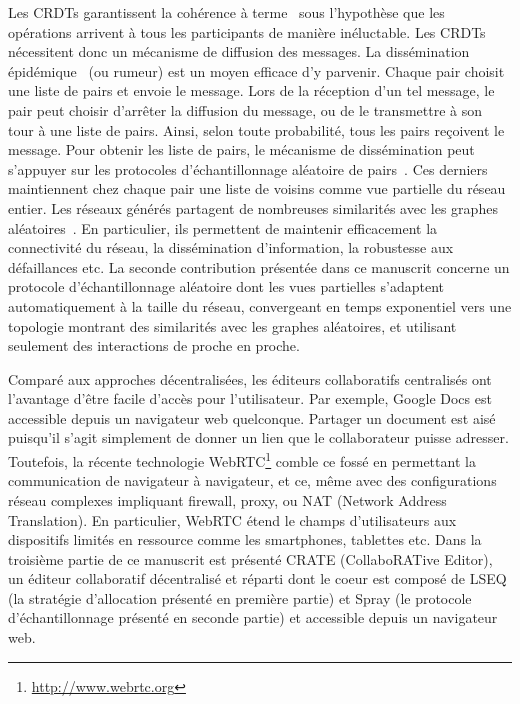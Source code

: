 Les CRDTs garantissent la cohérence à terme~\cite{bailis2013eventual} sous
l'hypothèse que les opérations arrivent à tous les participants de manière
inéluctable. Les CRDTs nécessitent donc un mécanisme de diffusion des
messages. La dissémination épidémique~\cite{demers1987epidemic,
  eugster2003lightweight, birman1999bimodal} (ou rumeur) est un moyen efficace
d'y parvenir. Chaque pair choisit une liste de pairs et envoie le message. Lors
de la réception d'un tel message, le pair peut choisir d'arrêter la diffusion du
message, ou de le transmettre à son tour à une liste de pairs. Ainsi, selon
toute probabilité, tous les pairs reçoivent le message. Pour obtenir les liste
de pairs, le mécanisme de dissémination peut s'appuyer sur les protocoles
d'échantillonnage aléatoire de pairs~\cite{jelasity2007gossip,
  voulgaris2005cyclon, ganesh2001scamp, tolgyeski2009adaptive,
  eugster2003lightweight}. Ces derniers maintiennent chez chaque pair une liste
de voisins comme vue partielle du réseau entier. Les réseaux générés partagent
de nombreuses similarités avec les graphes aléatoires~\cite{erdos1959random}. En
particulier, ils permettent de maintenir efficacement la connectivité du réseau,
la dissémination d'information, la robustesse aux défaillances etc. La seconde
contribution présentée dans ce manuscrit concerne un protocole d'échantillonnage
aléatoire dont les vues partielles s'adaptent automatiquement à la taille du
réseau, convergeant en temps exponentiel vers une topologie montrant des
similarités avec les graphes aléatoires, et utilisant seulement des interactions
de proche en proche.

Comparé aux approches décentralisées, les éditeurs collaboratifs centralisés ont
l'avantage d'être facile d'accès pour l'utilisateur. Par exemple, Google Docs
est accessible depuis un navigateur web quelconque. Partager un document est
aisé puisqu'il s'agit simplement de donner un lien que le collaborateur puisse
adresser. Toutefois, la récente technologie
WebRTC\footnote{\url{http://www.webrtc.org}} comble ce fossé en permettant la
communication de navigateur à navigateur, et ce, même avec des configurations
réseau complexes impliquant firewall, proxy, ou NAT (Network Address
Translation). En particulier, WebRTC étend le champs d'utilisateurs aux
dispositifs limités en ressource comme les smartphones, tablettes etc. Dans la
troisième partie de ce manuscrit est présenté CRATE (CollaboRATive Editor), un
éditeur collaboratif décentralisé et réparti dont le coeur est composé de LSEQ
(la stratégie d'allocation présenté en première partie) et Spray (le protocole
d'échantillonnage présenté en seconde partie) et accessible depuis un navigateur
web.

